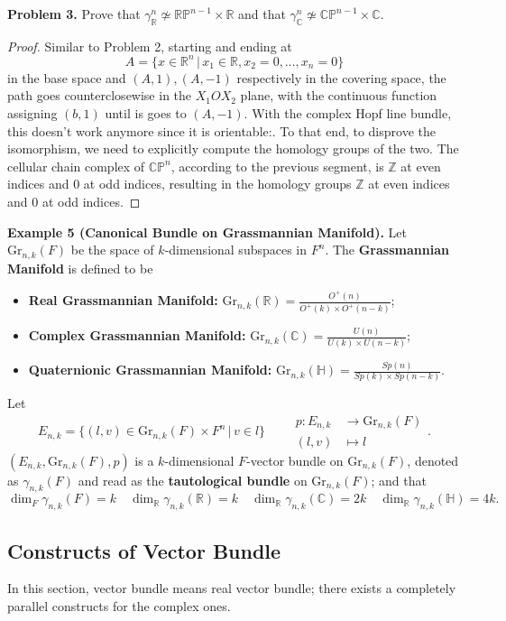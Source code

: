 \documentclass[10pt]{article}
\newcounter{counter}
\begin{document}
\colorbox{blue!30}{\textbf{Problem 3.}} Prove that $\gamma^n_\mathbb{R}\not\simeq\mathbb{RP}^{n-1}\times\mathbb{R}$ and that  $\gamma^n_\mathbb{C}\not\simeq\mathbb{CP}^{n-1}\times\mathbb{C}$.
\begin{proof}
Similar to Problem 2, starting and ending at $$A=\{x\in\mathbb{R}^{n}\,\big|\,x_1\in\mathbb{R},x_2=0,\dots,x_{n}=0\}$$ in the base space and $(A,1),(A,-1)$ respectively in the covering space, the path goes counterclosewise in the $X_1OX_2$ plane, with the continuous function assigning $(b,1)$ until is goes to $(A,-1)$. With the complex Hopf line bundle, this doesn't work anymore since it is orientable:. To that end, to disprove the isomorphism, we need to explicitly compute the homology groups of the two. The cellular chain complex of $\mathbb{CP}^n$, according to the previous segment, is $\mathbb{Z}$ at even indices and $0$ at odd indices, resulting in the homology groups $\mathbb{Z}$ at even indices and $0$ at odd indices.
\end{proof}

\textbf{Example 5 (Canonical Bundle on Grassmannian Manifold).} Let $\mathrm{Gr}_{n,k}(F)$ be the space of $k$-dimensional subspaces in $F^n$. The \textbf{Grassmannian Manifold} is defined to be \begin{itemize}\item\textbf{Real Grassmannian Manifold:} $\mathrm{Gr}_{n,k}(\mathbb{R})=\displaystyle\frac{O^+(n)}{O^+(k)\times O^+(n-k)}$;\item\textbf{Complex Grassmannian Manifold:} $\mathrm{Gr}_{n,k}(\mathbb{C})=\displaystyle\frac{U(n)}{U(k)\times U(n-k)}$;\item\textbf{Quaternionic Grassmannian Manifold:} $\mathrm{Gr}_{n,k}(\mathbb{H})=\displaystyle\frac{Sp(n)}{Sp(k)\times Sp(n-k)}$.\end{itemize} Let $$E_{n,k}=\{(l,v)\in \mathrm{Gr}_{n,k}(F)\times F^n\,\big|\,v\in l\}\quad\quad\begin{aligned}p:E_{n,k}&\to\mathrm{Gr}_{n,k}(F)\\(l,v)&\mapsto l\end{aligned}.$$ $(E_{n,k},\mathrm{Gr}_{n,k}(F),p)$ is a $k$-dimensional $F$-vector bundle on $\mathrm{Gr}_{n,k}(F)$, denoted as $\gamma_{n,k}(F)$ and read as the \textbf{tautological bundle} on $\mathrm{Gr}_{n,k}(F)$; and that $$\dim_F\gamma_{n,k}(F)=k\quad\dim_{\mathbb{R}}\gamma_{n,k}(\mathbb{R})=k\quad\dim_{\mathbb{R}}\gamma_{n,k}(\mathbb{C})=2k\quad\dim_{\mathbb{R}}\gamma_{n,k}(\mathbb{H})=4k.$$

\subsection{Constructs of Vector Bundle}
In this section, vector bundle means real vector bundle; there exists a completely parallel constructs for the complex ones.
\end{document}
